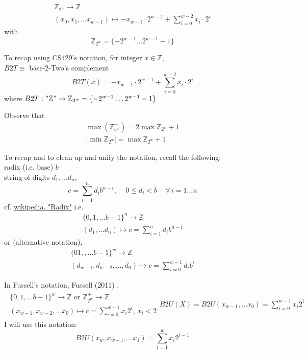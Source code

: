 \documentclass[10pt]{amsart}
\begin{document}
\begin{equation}
\begin{gathered}
\mathbb{Z}_{2^w} \to \mathbb{Z} \\
(x_0, x_1, \dots x_{w-1}) \mapsto -x_{w-1} \cdot 2^{w-1} + \sum_{i=0}^{w-2} x_i \cdot 2^i
\end{gathered}
\end{equation}
with
\begin{equation}
\mathbb{Z}_{2^w} = \lbrace - 2^{w-1} \dots 2^{w-1} -1 \rbrace
\end{equation}

To recap using CS429's notation, for integer $x \in \mathbb{Z}$, \\
$B2T \equiv $ base-2-Two's complement \\
\[
B2T(x) = -x_{w-1} \cdot 2^{w-1} + \sum_{i=0}^{w-2} x_i \cdot 2^i
\]
where $B2T: "\mathbb{Z}" \to \mathbb{Z}_{2^w} = \lbrace -2^{w-1} \dots 2^{w-1} - 1 \rbrace$


Observe that 
\begin{equation}
\begin{gathered}
\max{ \left( \mathbb{Z}^+_{2^w} \right) } = 2 \max{ \mathbb{Z}_{2^w} } + 1 \\
| \min{ \mathbb{Z}_{2^w} } | = \max{ \mathbb{Z}_{2^w} } + 1
\end{gathered}
\end{equation}

To recap and to clean up and unify the notation, recall the following: \\
radix (i.e. base) $b$ \\
string of digits $d_1, \dots d_n$, 
\[
c = \sum_{i=1}^n d_i b^{n-i} , \quad \, 0 \leq d_i < b \quad \, \forall \, i = 1 \dots n
\]
cf. \href{https://en.wikipedia.org/wiki/Radix}{wikipedia, "Radix"}
i.e.
\[
\begin{gathered}
\lbrace 0 ,1 ,\dots b-1 \rbrace^n \to \mathbb{Z} \\ 
(d_1, \dots d_n) \mapsto c = \sum_{i=1}^n d_i b^{n-i}
\end{gathered}
\]
or (alternative notation),
\[
\begin{gathered}
\lbrace 0 1, ,\dots b-1 \rbrace^w \to \mathbb{Z} \\ 
(d_{w-1}, d_{w-2}, \dots, d_0) \mapsto c = \sum_{i=0}^{w-1} d_i b^i 
\end{gathered}
\]

In Fussell's notation, Fussell (2011) \cite{Fuss2011},
\[
\begin{gathered}
\begin{gathered}
\lbrace 0 ,1, \dots b-1 \rbrace^w \to \mathbb{Z} \text{ or } \mathbb{Z}^+_{2^w} \to \mathbb{Z}^+ \\
(x_{w-1}, x_{w-2}, \dots x_0) \mapsto c = \sum_{i=0}^{w-1} x_i 2^i, \, x_i < 2
\end{gathered}
B2U(X) = B2U(x_{w-1}, \dots x_0) = \sum_{i=0}^{w-1} x_i 2^i
\end{gathered}
\]
I will use this notation:
\[
B2U(x_w, x_{w-1}, \dots x_1) = \sum_{i=1}^w x_i 2^{i-1}
\]
\end{document}
